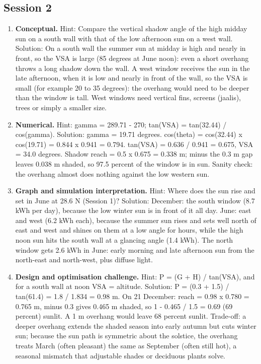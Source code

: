 \documentclass[11pt,a4paper]{article}
\begin{document}
\subsection*{Session 2}
\begin{enumerate}[nosep]
\item \textbf{Conceptual.} Hint: Compare the vertical shadow angle of the high midday sun on a south wall with that of the low afternoon sun on a west wall. Solution: On a south wall the summer sun at midday is high and nearly in front, so the VSA is large (85 degrees at June noon): even a short overhang throws a long shadow down the wall. A west window receives the sun in the late afternoon, when it is low and nearly in front of the wall, so the VSA is small (for example 20 to 35 degrees): the overhang would need to be deeper than the window is tall. West windows need vertical fins, screens (jaalis), trees or simply a smaller size.
\item \textbf{Numerical.} Hint: gamma = 289.71 - 270; tan(VSA) = tan(32.44) / cos(gamma). Solution: gamma = 19.71 degrees. cos(theta) = cos(32.44) x cos(19.71) = 0.844 x 0.941 = 0.794. tan(VSA) = 0.636 / 0.941 = 0.675, VSA = 34.0 degrees. Shadow reach = 0.5 x 0.675 = 0.338 m; minus the 0.3 m gap leaves 0.038 m shaded, so 97.5 percent of the window is in sun. Sanity check: the overhang almost does nothing against the low western sun.
\item \textbf{Graph and simulation interpretation.} Hint: Where does the sun rise and set in June at 28.6 N (Session 1)? Solution: December: the south window (8.7 kWh per day), because the low winter sun is in front of it all day. June: east and west (6.2 kWh each), because the summer sun rises and sets well north of east and west and shines on them at a low angle for hours, while the high noon sun hits the south wall at a glancing angle (1.4 kWh). The north window gets 2.6 kWh in June: early morning and late afternoon sun from the north-east and north-west, plus diffuse light.
\item \textbf{Design and optimisation challenge.} Hint: P = (G + H) / tan(VSA), and for a south wall at noon VSA = altitude. Solution: P = (0.3 + 1.5) / tan(61.4) = 1.8 / 1.834 = 0.98 m. On 21 December: reach = 0.98 x 0.780 = 0.765 m, minus 0.3 gives 0.465 m shaded, so 1 - 0.465 / 1.5 = 0.69 (69 percent) sunlit. A 1 m overhang would leave 68 percent sunlit. Trade-off: a deeper overhang extends the shaded season into early autumn but cuts winter sun; because the sun path is symmetric about the solstice, the overhang treats March (often pleasant) the same as September (often still hot), a seasonal mismatch that adjustable shades or deciduous plants solve.
\end{enumerate}
\end{document}
